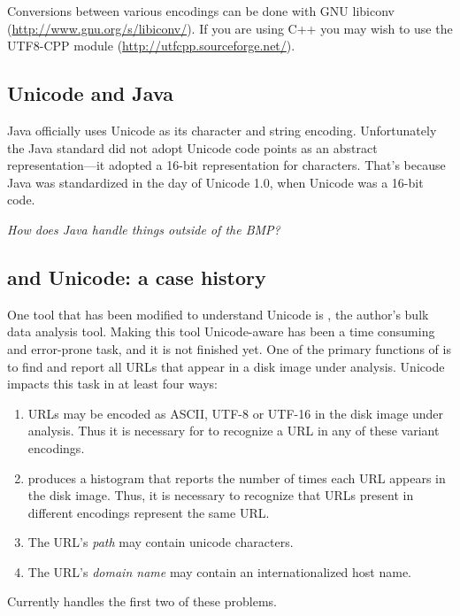 Conversions between various encodings can be done with GNU libiconv (\url{http://www.gnu.org/s/libiconv/}). If you are using C++ you may wish to use the UTF8-CPP module (\url{http://utfcpp.sourceforge.net/}).





\subsection{Unicode and Java}
Java officially uses Unicode as its character and string encoding. Unfortunately the Java standard did not adopt Unicode code points as an abstract representation---it adopted a 16-bit representation for characters. That's because Java was standardized in the day of Unicode 1.0, when Unicode was a 16-bit code.

\emph{How does Java handle things outside of the BMP?}


\subsection{\be and Unicode: a case history}
One tool that has been modified to understand Unicode is
\be, the author's bulk data analysis tool. Making
this tool Unicode-aware has been a time consuming and error-prone
task, and it is not finished yet. One of the primary functions of \be
is to find and report all URLs that appear in a disk image under
analysis. Unicode impacts this task in at least four ways:

\begin{enumerate}
\item URLs may be encoded as ASCII, UTF-8 or UTF-16 in the disk image
  under analysis. Thus it is necessary for \be to recognize a URL in
  any of these variant encodings.\label{url-encoding}
\item \be produces a histogram that reports the number of times each
  URL appears in the disk image. Thus, it is necessary to recognize
  that URLs present in different encodings represent the same URL.\label{url-matching}
\item The URL's \emph{path} may contain unicode characters.\label{url-path}
\item The URL's \emph{domain name} may contain an internationalized
  host name.\label{url-domain}
\end{enumerate}

Currently \be handles the first two of these problems.

